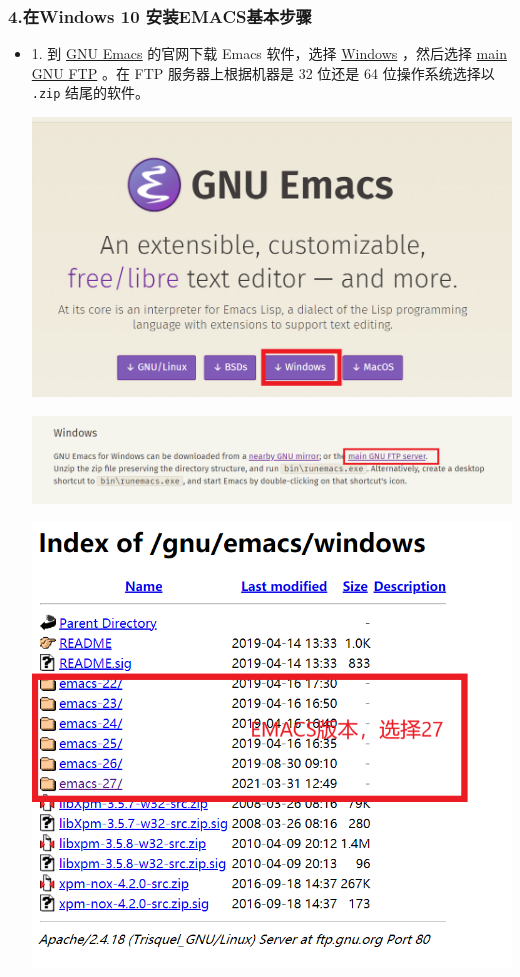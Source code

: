 \documentclass[UTF8]{ctexart}
\begin{document}
\subsubsection*{4.在Windows 10 安装EMACS基本步骤}
\label{sec:org2653839}
\begin{itemize}
\item 1. 到 \href{http://www.gnu.org/software/emacs/}{GNU Emacs} 的官网下载 Emacs 软件，选择 \href{https://www.gnu.org/software/emacs/download.html\#nonfree}{Windows} ，然后选择 \href{http://ftp.gnu.org/gnu/emacs/windows/}{main GNU FTP} 。在 FTP 服务器上根据机器是 32 位还是 64 位操作系统选择以 \texttt{.zip} 结尾的软件。
\label{sec:org23cd40f}
\begin{center}
\includegraphics[width=.9\linewidth]{image/3.png}
\end{center}
\begin{center}
\includegraphics[width=.9\linewidth]{image/4.png}
\end{center}
\begin{center}
\includegraphics[width=.9\linewidth]{image/5.png}

\end{center}
\end{itemize}
\end{document}
